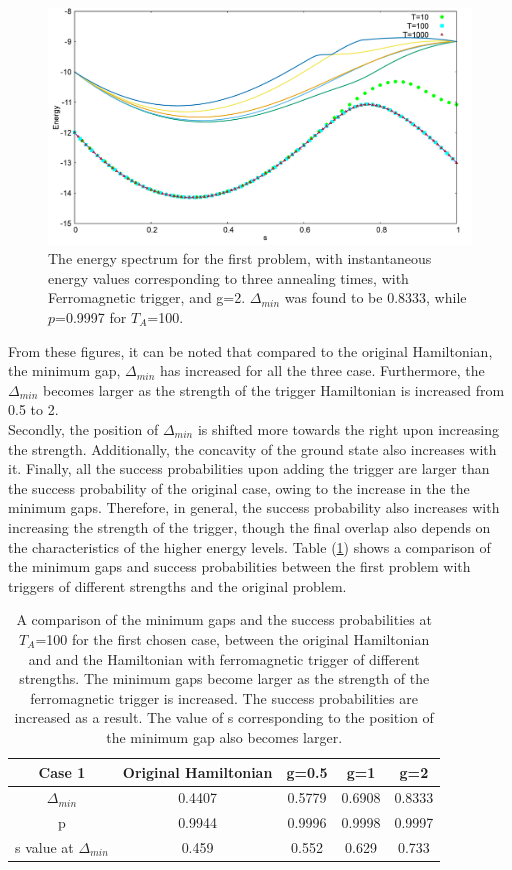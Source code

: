\documentclass[12]{article}
\begin{document}
\begin{figure}[H]
\centering 
\includegraphics[scale=0.3]{733_s12_F_g2.png}
\caption{The energy spectrum for the first problem, with instantaneous energy values corresponding to three annealing times, with Ferromagnetic trigger, and g=2. $\Delta_{min}$ was found to be 0.8333, while $p$=0.9997 for $T_A$=100.}
\label{fig:f3}
\end{figure}
From these figures, it can be noted that compared to the original Hamiltonian, the minimum gap, $\Delta_{min}$ has increased for all the three case. Furthermore, the $\Delta_{min}$ becomes larger as the strength of the trigger Hamiltonian is increased from 0.5 to 2. \\
Secondly, the position of $\Delta_{min}$ is shifted more towards the right upon increasing the strength. Additionally, the concavity of the ground state also increases with it. 
Finally, all the success probabilities upon adding the trigger are larger than the success probability of the original case, owing to the increase in the the minimum gaps. Therefore, in general, the success probability also increases with increasing the strength of the trigger, though the final overlap also depends on the characteristics of the higher energy levels. 
Table (\ref{tab:f1}) shows a comparison of the minimum gaps and success probabilities between the first problem with triggers of different strengths and the original problem. 
\begin{table}
\centering
\renewcommand{\arraystretch}{1.8}
\begin{tabular}{|c|c|c|c|c|}
\hline 
Case 1 & Original Hamiltonian & g=0.5 & g=1 & g=2 \\ 
\hline 
$\Delta_{min}$ & 0.4407 & 0.5779 & 0.6908 & 0.8333 \\ 
\hline 
p & 0.9944 & 0.9996 & 0.9998 & 0.9997 \\ 
\hline 
s value at $\Delta_{min}$ & 0.459 & 0.552 & 0.629 & 0.733 \\
\hline

\end{tabular} 
\caption{A comparison of the minimum gaps and the success probabilities at $T_A$=100 for the first chosen case, between the original Hamiltonian and and the Hamiltonian with ferromagnetic trigger of different strengths. The minimum gaps become larger as the strength of the ferromagnetic trigger is increased. The success probabilities are increased as a result. The value of s corresponding to the position of the minimum gap also becomes larger.}
\label{tab:f1}
\end{table}
\end{document}
